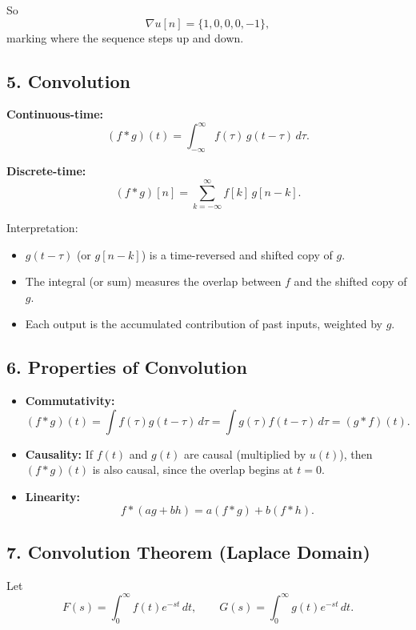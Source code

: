 \documentclass[12pt,a4paper]{article}
\begin{document}
		So
		$$
		\nabla u[n] = \{1,0,0,0,-1\},
		$$
		marking where the sequence steps up and down.
		
			
		\subsection*{5. Convolution}
		
		\textbf{Continuous-time:}
		$$
		(f*g)(t) = \int_{-\infty}^{\infty} f(\tau)\,g(t-\tau)\,d\tau.
		$$
		
		\textbf{Discrete-time:}
		$$
		(f*g)[n] = \sum_{k=-\infty}^{\infty} f[k]\, g[n-k].
		$$
		
		Interpretation:
		\begin{itemize}
			\item $g(t-\tau)$ (or $g[n-k]$) is a time-reversed and shifted copy of $g$.
			\item The integral (or sum) measures the overlap between $f$ and the shifted copy of $g$.
			\item Each output is the accumulated contribution of past inputs, weighted by $g$.
		\end{itemize}
		
			
		\subsection*{6. Properties of Convolution}
		
		\begin{itemize}
			\item \textbf{Commutativity:}
			$$
			(f*g)(t) = \int f(\tau)g(t-\tau)\,d\tau 
			= \int g(\tau)f(t-\tau)\,d\tau 
			= (g*f)(t).
			$$
			
			\item \textbf{Causality:}  
			If $f(t)$ and $g(t)$ are causal (multiplied by $u(t)$), then $(f*g)(t)$ is also causal, since the overlap begins at $t=0$.
			
			\item \textbf{Linearity:}  
			$$
			f*(ag+bh) = a(f*g) + b(f*h).
			$$
		\end{itemize}
		
		
		\subsection*{7. Convolution Theorem (Laplace Domain)}
		
		Let
		$$
		F(s) = \int_0^\infty f(t)e^{-st}\,dt,
		\qquad
		G(s) = \int_0^\infty g(t)e^{-st}\,dt.
		$$
		
\end{document}
